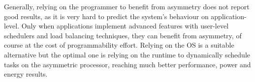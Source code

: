 
Generally, relying on the programmer to benefit from asymmetry does not report good results, as it is very hard to predict the system's behaviour on application-level. Only when applications implement advanced features with user-level schedulers and load balancing techniques, they can benefit from asymmetry, of course at the cost of programmability effort. Relying on the OS is a suitable alternative but the optimal one is relying on the runtime to dynamically schedule tasks on the asymmetric processor, reaching much better performance, power and energy results.







